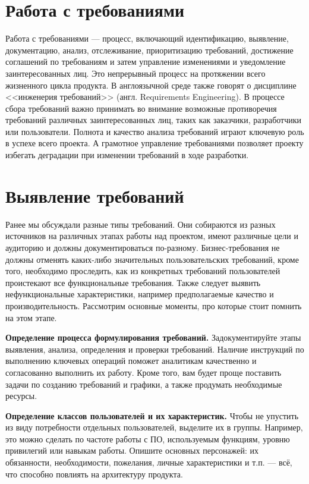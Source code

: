 \documentclass{../../text-style}
\begin{document}
\section{Работа с требованиями}

Работа с требованиями --- процесс, включающий идентификацию, выявление, документацию, анализ, отслеживание, приоритизацию требований, достижение соглашений по требованиям и затем управление изменениями и уведомление заинтересованных лиц. Это непрерывный процесс на протяжении всего жизненного цикла продукта. В англоязычной среде также говорят о дисциплине <<инженерия требований>> (англ. Requirements Engineering). В процессе сбора требований важно принимать во внимание возможные противоречия требований различных заинтересованных лиц, таких как заказчики, разработчики или пользователи. Полнота и качество анализа требований играют ключевую роль в успехе всего проекта. А грамотное управление требованиями позволяет проекту избегать деградации при изменении требований в ходе разработки.

\section{Выявление требований}

Ранее мы обсуждали разные типы требований. Они собираются из разных источников на различных этапах работы над проектом, имеют различные цели и аудиторию и должны документироваться по-разному. Бизнес-требования не должны отменять каких-либо значительных пользовательских требований, кроме того, необходимо проследить, как из конкретных требований пользователей проистекают все функциональные требования. Также следует выявить нефункциональные характеристики, например предполагаемые качество и производительность. Рассмотрим основные моменты, про которые стоит помнить на этом этапе.

\textbf{Определение процесса формулирования требований.} Задокументируйте этапы выявления, анализа, определения и проверки требований. Наличие инструкций по выполнению ключевых операций поможет аналитикам качественно и согласованно выполнить их работу. Кроме того, вам будет проще поставить задачи по созданию требований и графики, а также продумать необходимые ресурсы.

\textbf{Определение классов пользователей и их характеристик.} Чтобы не упустить из виду потребности отдельных пользователей, выделите их в группы. Например, это можно сделать по частоте работы с ПО, используемым функциям, уровню привилегий или навыкам работы. Опишите основных персонажей: их обязанности, необходимости, пожелания, личные характеристики и т.п. --- всё, что способно повлиять на архитектуру продукта.
\end{document}
